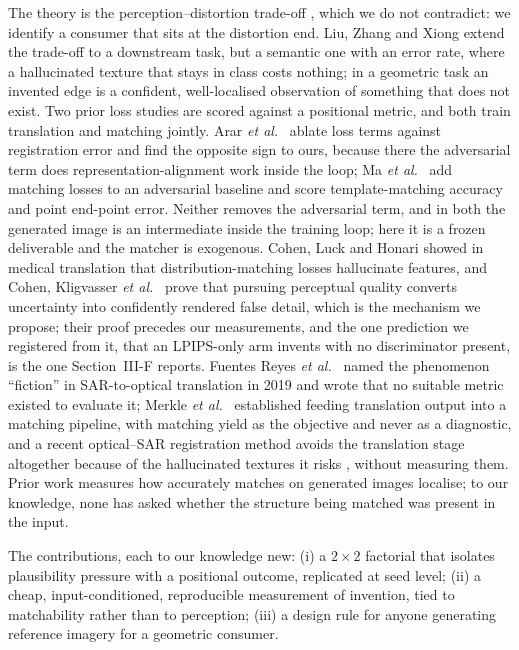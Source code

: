 The theory is the perception--distortion trade-off \cite{blau2018perception}, which we
do not contradict: we identify a consumer that sits at the distortion end. Liu, Zhang and
Xiong \cite{liu2019classification} extend the trade-off to a downstream task, but a
semantic one with an error rate, where a hallucinated texture that stays in class costs
nothing; in a geometric task an invented edge is a confident, well-localised observation
of something that does not exist. Two prior loss studies are scored against a positional metric, and both train
translation and matching jointly. Arar \emph{et al.}\ \cite{arar2020unsupervised}
ablate loss terms against registration error and find the opposite sign to ours, because
there the adversarial term does representation-alignment work inside the loop; Ma
\emph{et al.}\ \cite{ma2024visible} add matching losses to an adversarial baseline and
score template-matching accuracy and point end-point error. Neither removes the
adversarial term, and in both the generated image is an intermediate inside the training
loop; here it is a frozen deliverable and the matcher is exogenous. Cohen, Luck and
Honari \cite{cohen2018distribution} showed in medical translation that distribution-matching
losses hallucinate features, and Cohen, Kligvasser \emph{et al.}\ \cite{cohen2024looks}
prove that pursuing perceptual quality converts uncertainty into confidently rendered
false detail, which is the mechanism we propose; their proof precedes our measurements,
and the one prediction we registered from it, that an LPIPS-only arm invents with no
discriminator present, is the one Section~III-F reports. Fuentes Reyes \emph{et al.}\
\cite{fuentesreyes2019sar} named the phenomenon ``fiction'' in SAR-to-optical translation
in 2019 and wrote that no suitable metric existed to evaluate it; Merkle \emph{et al.}\
\cite{merkle2018exploring} established feeding translation output into a matching
pipeline, with matching yield as the objective and never as a diagnostic, and a recent
optical--SAR registration method avoids the translation stage altogether because of the
hallucinated textures it risks \cite{yu2026offsetnet}, without measuring them. Prior work
measures how accurately matches on generated images localise; to our knowledge, none has
asked whether the structure being matched was present in the input.

The contributions, each to our knowledge new: (i) a $2\times2$ factorial that isolates
plausibility pressure with a positional outcome, replicated at seed level; (ii) a cheap,
input-conditioned, reproducible measurement of invention, tied to matchability rather than
to perception; (iii) a design rule for anyone generating reference imagery for a geometric
consumer.
